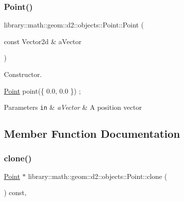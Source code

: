 \subsubsection{\texorpdfstring{Point()}{Point()}\hspace{0.1cm}{\footnotesize\ttfamily [2/2]}}
{\footnotesize\ttfamily library\+::math\+::geom\+::d2\+::objects\+::\+Point\+::\+Point (\begin{DoxyParamCaption}\item[{const Vector2d \&}]{a\+Vector }\end{DoxyParamCaption})}



Constructor. 


\begin{DoxyCode}
\hyperlink{classlibrary_1_1math_1_1geom_1_1d2_1_1objects_1_1_point_a4998aefdf80bdfd967f21d49fa050398}{Point} point(\{ 0.0, 0.0 \}) ;
\end{DoxyCode}



\begin{DoxyParams}[1]{Parameters}
\mbox{\tt in}  & {\em a\+Vector} & A position vector \\
\hline
\end{DoxyParams}


\subsection{Member Function Documentation}
\mbox{\label{classlibrary_1_1math_1_1geom_1_1d2_1_1objects_1_1_point_aa6b55bdbf5a0ce9ec8bc91ca79de3569}} 
\subsubsection{\texorpdfstring{clone()}{clone()}}
{\footnotesize\ttfamily \hyperlink{classlibrary_1_1math_1_1geom_1_1d2_1_1objects_1_1_point}{Point} $\ast$ library\+::math\+::geom\+::d2\+::objects\+::\+Point\+::clone (\begin{DoxyParamCaption}{ }\end{DoxyParamCaption}) const\hspace{0.3cm}{\ttfamily [override]}, {\ttfamily [virtual]}}



